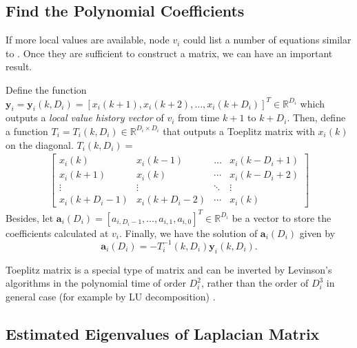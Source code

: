 \subsection{Find the Polynomial Coefficients}

If more local values are available, node $v_{i}$ could list a number
of equations similar to . Once they
are sufficient to construct a matrix, we can have an important result.

Define the function $\mathbf{y}_{i}=\mathbf{y}_{i}\left(k,D_{i}\right)=\left[x_{i}\left(k+1\right),x_{i}\left(k+2\right),\ldots,x_{i}\left(k+D_{i}\right)\right]^{T}\in\mathbb{R}^{D_{i}}$
which outputs a \textit{local value history vector} of $v_{i}$ from
time $k+1$ to $k+D_{i}$. Then, define a function $T_{i}=T_{i}\left(k,D_{i}\right)\in\mathbb{R}^{D_{i}\times D_{i}}$
that outputs a Toeplitz matrix with $x_{i}\left(k\right)$ on the
diagonal.  $T_{i}\left(k,D_{i}\right)=$
\begin{align}
\left[\begin{array}{cccc}
x_{i}\left(k\right) & x_{i}\left(k-1\right) & \ldots & x_{i}\left(k-D_{i}+1\right)\\
x_{i}\left(k+1\right) & x_{i}\left(k\right) & \cdots & x_{i}\left(k-D_{i}+2\right)\\
\vdots & \vdots & \ddots & \vdots\\
x_{i}\left(k+D_{i}-1\right) & x_{i}\left(k+D_{i}-2\right) & \cdots & x_{i}\left(k\right)
\end{array}\right]\label{eq:Toeplitz_i simple}
\end{align}
Besides, let $\mathbf{a}_{i}\left(D_{i}\right)=\left[a_{i,D_{i}-1},\ldots,a_{i,1},a_{i,0}\right]^{T}\in\mathbb{R}^{D_{i}}$
be a vector  to store the coefficients calculated at $v_{i}$. Finally,
we have the solution of $\mathbf{a}_{i}\left(D_{i}\right)$ given
by
\begin{equation}
\mathbf{a}_{i}\left(D_{i}\right)=-T_{i}^{-1}\left(k,D_{i}\right)\mathbf{y}_{i}\left(k,D_{i}\right).\label{eq:Toeplitz Eq.}
\end{equation}


Toeplitz matrix is a special type of matrix and can be inverted by
Levinson's algorithms in the polynomial time of order $D_{i}^{2}$,
rather than the order of $D_{i}^{3}$ in general case (for example
by LU decomposition) \cite{Prass2007}.     


\subsection{Estimated Eigenvalues of Laplacian Matrix}

